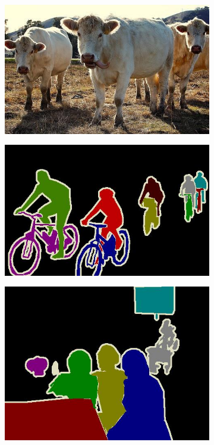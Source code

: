 \begin{figure}[h]
\begin{subfigure}{.25\textwidth}
  \end{subfigure}%
  \begin{subfigure}{.25\textwidth}
    \includegraphics[width=1.\linewidth,height=0.618\linewidth]{figures/pascal_dataset/image-4.jpg}
  \end{subfigure}
  \begin{subfigure}{.25\textwidth}
    \includegraphics[width=1.\linewidth,height=0.618\linewidth]{figures/pascal_dataset/annotation-1.jpg}
  \end{subfigure}%
  \begin{subfigure}{.25\textwidth}
    \includegraphics[width=1.\linewidth,height=0.618\linewidth]{figures/pascal_dataset/annotation-2.jpg}

\end{subfigure}
\end{figure}
